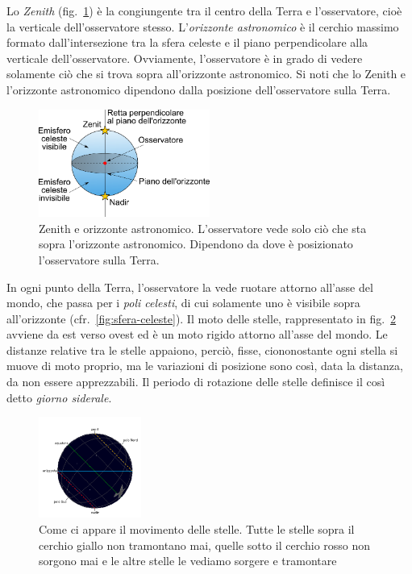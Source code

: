 Lo \emph{Zenith} (fig.~\ref{fig:zenith}) è la congiungente tra il centro della Terra e l'osservatore, cioè la verticale dell'osservatore stesso. L'\emph{orizzonte astronomico} è il cerchio massimo formato dall'intersezione tra la sfera celeste e il piano perpendicolare alla verticale dell'osservatore. Ovviamente, l'osservatore è in grado di vedere solamente ciò che si trova sopra all'orizzonte astronomico. Si noti che lo Zenith e l'orizzonte astronomico dipendono dalla posizione dell'osservatore sulla Terra.

\begin{figure}
\centering
\includegraphics[width=0.5\textwidth]{immagini/zenit.png}
\caption{Zenith e orizzonte astronomico. L'osservatore vede solo ciò che sta sopra l'orizzonte astronomico. Dipendono da dove è posizionato l'osservatore sulla Terra.}
\label{fig:zenith}
\end{figure}

In ogni punto della Terra, l'osservatore la vede ruotare attorno all'asse del mondo, che passa per i \emph{poli celesti}, di cui solamente uno è visibile sopra all'orizzonte (cfr.~\ref{fig:sfera-celeste}). Il moto delle stelle, rappresentato in fig.~\ref{fig:movimento-stelle} avviene da est verso ovest ed è un moto rigido attorno all'asse del mondo. Le distanze relative tra le stelle appaiono, perciò, fisse, ciononostante ogni stella si muove di moto proprio, ma le variazioni di posizione sono così, data la distanza, da non essere apprezzabili. Il periodo di rotazione delle stelle definisce il così detto \emph{giorno siderale}.

\begin{figure}
\centering
\includegraphics[width=0.3\textwidth]{immagini/movimento-stelle.png}
\caption{Come ci appare il movimento delle stelle. Tutte le stelle sopra il cerchio giallo non tramontano mai, quelle sotto il cerchio rosso non sorgono mai e le altre stelle le vediamo sorgere e tramontare}
\label{fig:movimento-stelle}
\end{figure}

